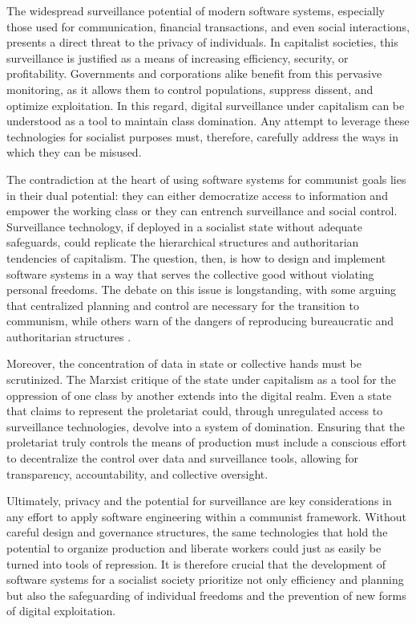 \begin{refsection}
The widespread surveillance potential of modern software systems, especially those used for communication, financial transactions, and even social interactions, presents a direct threat to the privacy of individuals. In capitalist societies, this surveillance is justified as a means of increasing efficiency, security, or profitability. Governments and corporations alike benefit from this pervasive monitoring, as it allows them to control populations, suppress dissent, and optimize exploitation. In this regard, digital surveillance under capitalism can be understood as a tool to maintain class domination. Any attempt to leverage these technologies for socialist purposes must, therefore, carefully address the ways in which they can be misused.

The contradiction at the heart of using software systems for communist goals lies in their dual potential: they can either democratize access to information and empower the working class or they can entrench surveillance and social control. Surveillance technology, if deployed in a socialist state without adequate safeguards, could replicate the hierarchical structures and authoritarian tendencies of capitalism. The question, then, is how to design and implement software systems in a way that serves the collective good without violating personal freedoms. The debate on this issue is longstanding, with some arguing that centralized planning and control are necessary for the transition to communism, while others warn of the dangers of reproducing bureaucratic and authoritarian structures \cite[pp.~134]{lenin_state_and_revolution}.

Moreover, the concentration of data in state or collective hands must be scrutinized. The Marxist critique of the state under capitalism as a tool for the oppression of one class by another extends into the digital realm. Even a state that claims to represent the proletariat could, through unregulated access to surveillance technologies, devolve into a system of domination. Ensuring that the proletariat truly controls the means of production must include a conscious effort to decentralize the control over data and surveillance tools, allowing for transparency, accountability, and collective oversight.

Ultimately, privacy and the potential for surveillance are key considerations in any effort to apply software engineering within a communist framework. Without careful design and governance structures, the same technologies that hold the potential to organize production and liberate workers could just as easily be turned into tools of repression. It is therefore crucial that the development of software systems for a socialist society prioritize not only efficiency and planning but also the safeguarding of individual freedoms and the prevention of new forms of digital exploitation.


\end{refsection}
